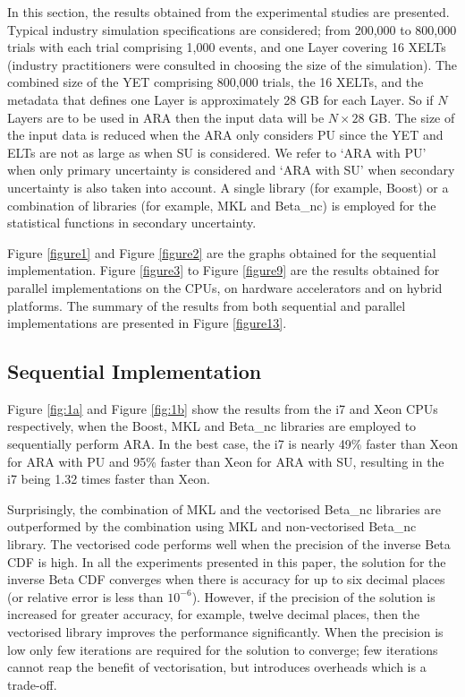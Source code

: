 
In this section, the results obtained from the experimental studies are presented. Typical industry simulation specifications are considered; from 200,000 to 800,000 trials with each trial comprising 1,000 events, and one Layer covering 16 XELTs (industry practitioners were consulted in choosing the size of the simulation). The combined size of the YET comprising 800,000 trials, the 16 XELTs, and the metadata that defines one Layer is approximately 28 GB for each Layer. So if $N$ Layers are to be used in ARA then the input data will be $N \times 28$ GB. The size of the input data is reduced when the ARA only considers PU since the YET and ELTs are not as large as when SU is considered. We refer to `ARA with PU' when only primary uncertainty is considered and `ARA with SU' when secondary uncertainty is also taken into account. A single library (for example, Boost) or a combination of libraries (for example, MKL and Beta\_nc) is employed for the statistical functions in secondary uncertainty. 

Figure \ref{figure1} and Figure \ref{figure2} are the graphs obtained for the sequential implementation. Figure \ref{figure3} to Figure \ref{figure9} are the results obtained for parallel implementations on the CPUs, on hardware accelerators and on hybrid platforms. The summary of the results from both sequential and parallel implementations are presented in Figure \ref{figure13}.

\subsection{Sequential Implementation}

Figure \ref{fig:1a} and Figure \ref{fig:1b} show the results from the i7 and Xeon CPUs respectively, when the Boost, MKL and Beta\_nc libraries are employed to sequentially perform ARA. 
In the best case, the i7 is nearly 49\% faster than Xeon for ARA with PU and 95\% faster than Xeon for ARA with SU, resulting in the i7 being 1.32 times faster than Xeon. 

Surprisingly, the combination of MKL and the vectorised Beta\_nc libraries are outperformed by the combination using MKL and non-vectorised Beta\_nc library. 
The vectorised code performs well when the precision of the inverse Beta CDF is high. 
In all the experiments presented in this paper, the solution for the inverse Beta CDF converges when there is accuracy for up to six decimal places (or relative error is less than $10^{-6}$). 
However, if the precision of the solution is increased for greater accuracy, for example, twelve decimal places, then the vectorised library improves the performance significantly. 
When the precision is low only few iterations are required for the solution to converge; few iterations cannot reap the benefit of vectorisation, but introduces overheads which is a trade-off. 


